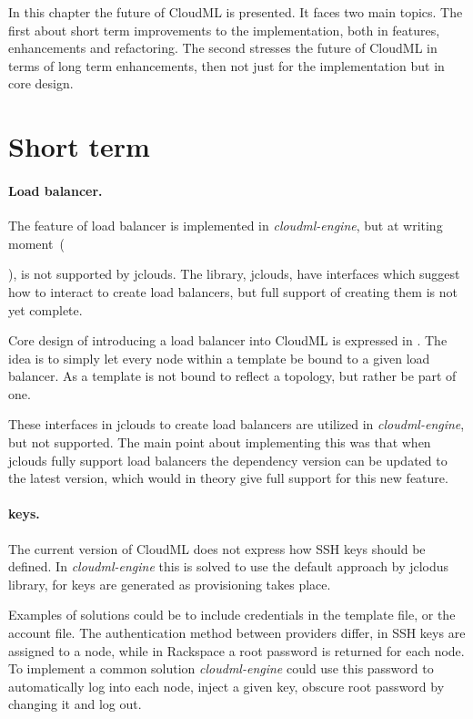 
In this chapter the future of CloudML is presented.
It faces two main topics.
The first about short term improvements to the implementation, both in features, enhancements and refactoring.
The second stresses the future of CloudML in terms of long term enhancements,
then not just for the implementation but in core design.

\section{Short term}

\paragraph{Load balancer.}


The feature of load balancer is implemented in \emph{cloudml-engine}, but at writing moment~(\date{April 2012}),
is not supported by jclouds.
The library, jclouds, have interfaces which suggest how to interact to create load balancers,
but full support of creating them is not yet complete.

Core design of introducing a load balancer into CloudML is expressed in .
The idea is to simply let every node within a template be bound to a given load balancer.
As a template is not bound to reflect a topology, but rather be part of one.

These interfaces in jclouds to create load balancers are utilized in \emph{cloudml-engine}, but not supported.
The main point about implementing this was that when jclouds fully support load balancers the dependency version
can be updated to the latest version, which would in theory give full support for this new feature.

\paragraph{ keys.}

The current version of CloudML does not express how SSH keys should be defined.
In \emph{cloudml-engine} this is solved to use the default approach by jclodus library,
\ie for  keys are generated as provisioning takes place.

Examples of solutions could be to include credentials in the template file, or the account file.
The authentication method between providers differ, \eg in  SSH keys are assigned to a node,
while in Rackspace a root password is returned for each node.
To implement a common solution \emph{cloudml-engine} could use this password to automatically 
log into each node, inject a given  key, obscure root password by changing it and log out.

